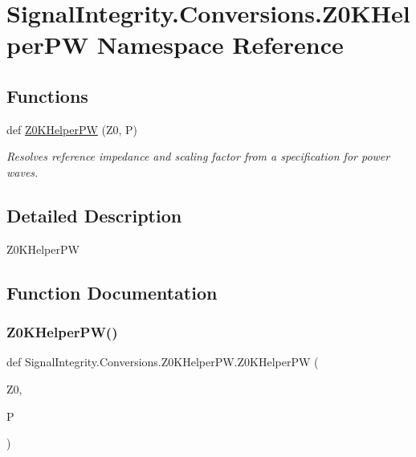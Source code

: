 \hypertarget{namespaceSignalIntegrity_1_1Conversions_1_1Z0KHelperPW}{}\section{Signal\+Integrity.\+Conversions.\+Z0\+K\+Helper\+PW Namespace Reference}
\label{namespaceSignalIntegrity_1_1Conversions_1_1Z0KHelperPW}
\subsection*{Functions}
\begin{DoxyCompactItemize}
\item 
def \hyperlink{namespaceSignalIntegrity_1_1Conversions_1_1Z0KHelperPW_aa6cf56b735b0f26be271f84297b09c3b}{Z0\+K\+Helper\+PW} (Z0, P)
\begin{DoxyCompactList}\small\item\em Resolves reference impedance and scaling factor from a specification for power waves. \end{DoxyCompactList}\end{DoxyCompactItemize}


\subsection{Detailed Description}
\begin{DoxyVerb}Z0KHelperPW\end{DoxyVerb}
 

\subsection{Function Documentation}
\mbox{\label{namespaceSignalIntegrity_1_1Conversions_1_1Z0KHelperPW_aa6cf56b735b0f26be271f84297b09c3b}} 
\subsubsection{\texorpdfstring{Z0\+K\+Helper\+P\+W()}{Z0KHelperPW()}}
{\footnotesize\ttfamily def Signal\+Integrity.\+Conversions.\+Z0\+K\+Helper\+P\+W.\+Z0\+K\+Helper\+PW (\begin{DoxyParamCaption}\item[{}]{Z0,  }\item[{}]{P }\end{DoxyParamCaption})}



